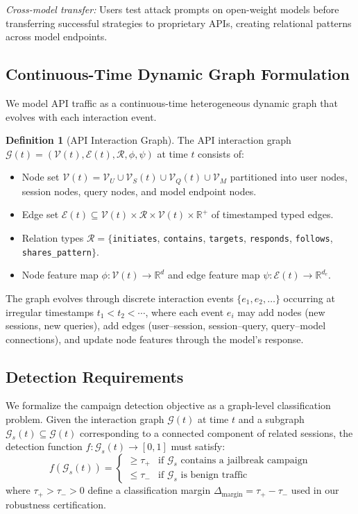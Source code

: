 \documentclass[journal]{IEEEtran}
\newcommand{\R}{\mathbb{R}}
\newcommand{\G}{\mathcal{G}}
\newcommand{\calV}{\mathcal{V}}
\newcommand{\calE}{\mathcal{E}}
\newcommand{\calR}{\mathcal{R}}
\theoremstyle{plain}
\theoremstyle{definition}
\newtheorem{definition}{Definition}
\theoremstyle{remark}
\begin{document}
\textit{Cross-model transfer:} Users test attack prompts on open-weight models before transferring successful strategies to proprietary APIs, creating relational patterns across model endpoints.

\subsection{Continuous-Time Dynamic Graph Formulation}

We model API traffic as a continuous-time heterogeneous dynamic graph that evolves with each interaction event.

\begin{definition}[API Interaction Graph]
The API interaction graph $\G(t) = (\calV(t), \calE(t), \calR, \phi, \psi)$ at time $t$ consists of:
\begin{itemize}
\item Node set $\calV(t) = \calV_U \cup \calV_S(t) \cup \calV_Q(t) \cup \calV_M$ partitioned into user nodes, session nodes, query nodes, and model endpoint nodes.
\item Edge set $\calE(t) \subseteq \calV(t) \times \calR \times \calV(t) \times \R^+$ of timestamped typed edges.
\item Relation types $\calR = \{$\texttt{initiates}, \texttt{contains}, \texttt{targets}, \texttt{responds}, \texttt{follows}, \texttt{shares\_pattern}$\}$.
\item Node feature map $\phi: \calV(t) \to \R^d$ and edge feature map $\psi: \calE(t) \to \R^{d_e}$.
\end{itemize}
\end{definition}

The graph evolves through discrete interaction events $\{e_1, e_2, \ldots\}$ occurring at irregular timestamps $t_1 < t_2 < \cdots$, where each event $e_i$ may add nodes (new sessions, new queries), add edges (user--session, session--query, query--model connections), and update node features through the model's response.

\subsection{Detection Requirements}

We formalize the campaign detection objective as a graph-level classification problem. Given the interaction graph $\G(t)$ at time $t$ and a subgraph $\G_s(t) \subseteq \G(t)$ corresponding to a connected component of related sessions, the detection function $f: \G_s(t) \to [0, 1]$ must satisfy:
\begin{equation}
f(\G_s(t)) = \begin{cases}
\geq \tau_+ & \text{if } \G_s \text{ contains a jailbreak campaign} \\
\leq \tau_- & \text{if } \G_s \text{ is benign traffic}
\end{cases}
\end{equation}
where $\tau_+ > \tau_- > 0$ define a classification margin $\Delta_{\text{margin}} = \tau_+ - \tau_-$ used in our robustness certification.
\end{document}
